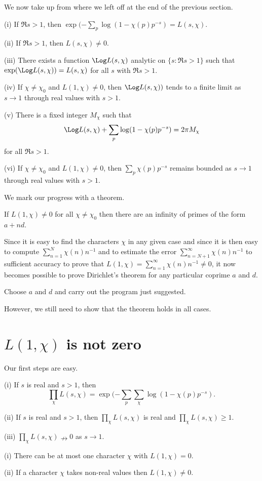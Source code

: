 We now take up from where we left off at the end
of the previous section.
\begin{lemma}  (i) If $\Re s>1$, then
$\exp(-\sum_{p}\log(1-\chi(p)p^{-s})=L(s,\chi)$.

(ii) If $\Re s>1$, then $L(s,\chi)\neq 0$.

(iii) There exists a function $\Log L(s,\chi)$ analytic
on $\{s: \Re s>1\}$ such that $\exp(\Log L(s,\chi))=L(s,\chi)$
for all $s$ with $\Re s>1$.

(iv) If $\chi\neq \chi_{0}$ and
$L(1,\chi)\neq 0$, then $\Log L(s,\chi))$ tends to
a finite limit as $s\rightarrow 1$ through real values with $s>1$.

(v) There is a fixed integer $M_{\chi}$ such that
\[\Log L(s,\chi)+\sum_{p}\log(1-\chi(p)p^{-s})=2\pi M_{\chi}\]
for all $\Re s>1$.

(vi) If $\chi\neq\chi_{0}$ and $L(1,\chi)\neq 0$, then
$\sum_{p}\chi(p)p^{-s}$ remains bounded as
$s\rightarrow 1$ through real values with $s>1$.
\end{lemma}

We mark our progress with a theorem.
\begin{theorem} If $L(1,\chi)\neq 0$ for all $\chi\neq\chi_{0}$
then there are an infinity of primes of the form
$a+nd$.
\end{theorem}

Since it is easy to find the characters $\chi$ in any given case
and since it is then easy to compute $\sum_{n=1}^{N}\chi(n)n^{-1}$
and to estimate the error $\sum_{n=N+1}^{\infty}\chi(n)n^{-1}$
to sufficient accuracy to prove that
$L(1,\chi)=\sum_{n=1}^{\infty}\chi(n)n^{-1}\neq 0$,
it now becomes possible to prove Dirichlet's theorem
for any particular coprime  $a$ and $d$.
\begin{exercise} Choose $a$ and $d$ and carry out the
program just suggested.
\end{exercise}
However, we still need to show that the  theorem holds
in all cases.
\section{$L(1,\chi)$ is not zero} Our first steps are easy.
\begin{lemma} (i) If $s$ is real and $s>1$, then
\[\prod_{\chi}L(s,\chi)=
\exp(-\sum_{p}\sum_{\chi}\log(1-\chi(p)p^{-s}).\]

(ii) If $s$ is real and $s>1$, then $\prod_{\chi}L(s,\chi)$
is real and $\prod_{\chi}L(s,\chi)\geq 1$.

(iii) $\prod_{\chi}L(s,\chi)\nrightarrow 0$ as
$s\rightarrow 1$.
\end{lemma}
\begin{lemma} (i) There can be at most one character
$\chi$ with $L(1,\chi)=0$.

(ii) If a character $\chi$ takes non-real values
then $L(1,\chi)\neq 0$.
\end{lemma}

